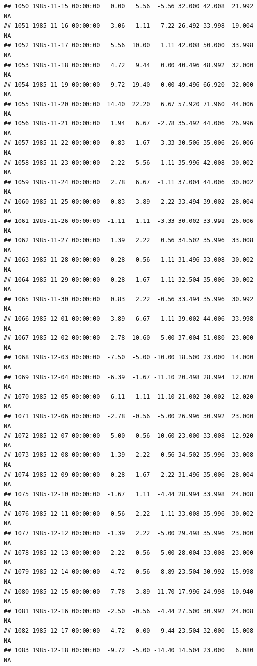 \documentclass{article}\usepackage{graphicx, color}
\makeatletter
\newenvironment{kframe}{%
 \def\at@end@of@kframe{}%
 \ifinner\ifhmode%
  \def\at@end@of@kframe{\end{minipage}}%
  \begin{minipage}{\columnwidth}%
 \fi\fi%
 \def\FrameCommand##1{\hskip\@totalleftmargin \hskip-\fboxsep
 \colorbox{shadecolor}{##1}\hskip-\fboxsep
     \hskip-\linewidth \hskip-\@totalleftmargin \hskip\columnwidth}%
 \MakeFramed {\advance\hsize-\width
   \@totalleftmargin\z@ \linewidth\hsize
   \@setminipage}}%
 {\par\unskip\endMakeFramed%
 \at@end@of@kframe}
\newenvironment{knitrout}{}{} %
\makeatother
\begin{document}
\begin{knitrout}
\begin{kframe}
\begin{verbatim}
## 1050 1985-11-15 00:00:00   0.00   5.56  -5.56 32.000 42.008  21.992     NA
## 1051 1985-11-16 00:00:00  -3.06   1.11  -7.22 26.492 33.998  19.004     NA
## 1052 1985-11-17 00:00:00   5.56  10.00   1.11 42.008 50.000  33.998     NA
## 1053 1985-11-18 00:00:00   4.72   9.44   0.00 40.496 48.992  32.000     NA
## 1054 1985-11-19 00:00:00   9.72  19.40   0.00 49.496 66.920  32.000     NA
## 1055 1985-11-20 00:00:00  14.40  22.20   6.67 57.920 71.960  44.006     NA
## 1056 1985-11-21 00:00:00   1.94   6.67  -2.78 35.492 44.006  26.996     NA
## 1057 1985-11-22 00:00:00  -0.83   1.67  -3.33 30.506 35.006  26.006     NA
## 1058 1985-11-23 00:00:00   2.22   5.56  -1.11 35.996 42.008  30.002     NA
## 1059 1985-11-24 00:00:00   2.78   6.67  -1.11 37.004 44.006  30.002     NA
## 1060 1985-11-25 00:00:00   0.83   3.89  -2.22 33.494 39.002  28.004     NA
## 1061 1985-11-26 00:00:00  -1.11   1.11  -3.33 30.002 33.998  26.006     NA
## 1062 1985-11-27 00:00:00   1.39   2.22   0.56 34.502 35.996  33.008     NA
## 1063 1985-11-28 00:00:00  -0.28   0.56  -1.11 31.496 33.008  30.002     NA
## 1064 1985-11-29 00:00:00   0.28   1.67  -1.11 32.504 35.006  30.002     NA
## 1065 1985-11-30 00:00:00   0.83   2.22  -0.56 33.494 35.996  30.992     NA
## 1066 1985-12-01 00:00:00   3.89   6.67   1.11 39.002 44.006  33.998     NA
## 1067 1985-12-02 00:00:00   2.78  10.60  -5.00 37.004 51.080  23.000     NA
## 1068 1985-12-03 00:00:00  -7.50  -5.00 -10.00 18.500 23.000  14.000     NA
## 1069 1985-12-04 00:00:00  -6.39  -1.67 -11.10 20.498 28.994  12.020     NA
## 1070 1985-12-05 00:00:00  -6.11  -1.11 -11.10 21.002 30.002  12.020     NA
## 1071 1985-12-06 00:00:00  -2.78  -0.56  -5.00 26.996 30.992  23.000     NA
## 1072 1985-12-07 00:00:00  -5.00   0.56 -10.60 23.000 33.008  12.920     NA
## 1073 1985-12-08 00:00:00   1.39   2.22   0.56 34.502 35.996  33.008     NA
## 1074 1985-12-09 00:00:00  -0.28   1.67  -2.22 31.496 35.006  28.004     NA
## 1075 1985-12-10 00:00:00  -1.67   1.11  -4.44 28.994 33.998  24.008     NA
## 1076 1985-12-11 00:00:00   0.56   2.22  -1.11 33.008 35.996  30.002     NA
## 1077 1985-12-12 00:00:00  -1.39   2.22  -5.00 29.498 35.996  23.000     NA
## 1078 1985-12-13 00:00:00  -2.22   0.56  -5.00 28.004 33.008  23.000     NA
## 1079 1985-12-14 00:00:00  -4.72  -0.56  -8.89 23.504 30.992  15.998     NA
## 1080 1985-12-15 00:00:00  -7.78  -3.89 -11.70 17.996 24.998  10.940     NA
## 1081 1985-12-16 00:00:00  -2.50  -0.56  -4.44 27.500 30.992  24.008     NA
## 1082 1985-12-17 00:00:00  -4.72   0.00  -9.44 23.504 32.000  15.008     NA
## 1083 1985-12-18 00:00:00  -9.72  -5.00 -14.40 14.504 23.000   6.080     NA

\end{verbatim}
\end{kframe}
\end{knitrout}
\end{document}
